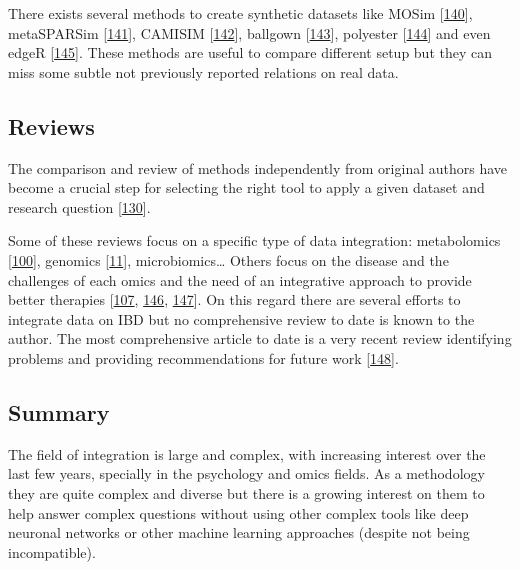 \documentclass[
  12pt,
  a4paper,
  twoside,
  openright]{book}
\begin{document}
There exists several methods to create synthetic datasets like MOSim {[}\protect\hyperlink{ref-martuxednez-mira2018}{140}{]}, metaSPARSim {[}\protect\hyperlink{ref-patuzzi2019}{141}{]}, CAMISIM {[}\protect\hyperlink{ref-fritz2019}{142}{]}, ballgown {[}\protect\hyperlink{ref-fu2021}{143}{]}, polyester {[}\protect\hyperlink{ref-frazee2021}{144}{]} and even edgeR {[}\protect\hyperlink{ref-mccarthy2012}{145}{]}.
These methods are useful to compare different setup but they can miss some subtle not previously reported relations on real data.

\hypertarget{reviews}{%
\subsection{Reviews}\label{reviews}}

The comparison and review of methods independently from original authors have become a crucial step for selecting the right tool to apply a given dataset and research question {[}\protect\hyperlink{ref-cantini2021}{130}{]}.

Some of these reviews focus on a specific type of data integration: metabolomics {[}\protect\hyperlink{ref-cavill2016}{100}{]}, genomics {[}\protect\hyperlink{ref-mcgovern2015}{11}{]}, microbiomics\ldots{} Others focus on the disease and the challenges of each omics and the need of an integrative approach to provide better therapies {[}\protect\hyperlink{ref-tarazona2021}{107}, \protect\hyperlink{ref-de_souza_ibd_2017}{146}, \protect\hyperlink{ref-valles-colomer2016}{147}{]}.
On this regard there are several efforts to integrate data on IBD but no comprehensive review to date is known to the author.
The most comprehensive article to date is a very recent review identifying problems and providing recommendations for future work {[}\protect\hyperlink{ref-sudhakar2022}{148}{]}.

\hypertarget{methods-integration}{%
\subsection{Summary}\label{methods-integration}}

The field of integration is large and complex, with increasing interest over the last few years, specially in the psychology and omics fields.
As a methodology they are quite complex and diverse but there is a growing interest on them to help answer complex questions without using other complex tools like deep neuronal networks or other machine learning approaches (despite not being incompatible).
\end{document}
